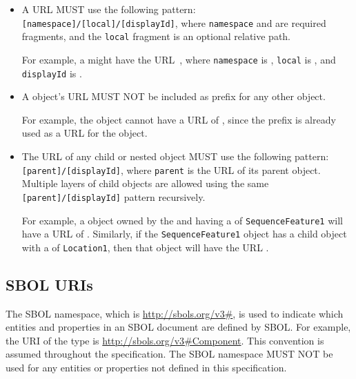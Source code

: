 \begin{itemize}

 \item A  URL MUST use the following pattern:
  \texttt{[namespace]/[local]/[displayId]},  where \texttt{namespace} and  are required fragments, and the \texttt{local} fragment is an optional relative path.
  
  	For example, a  might have the URL~, where \texttt{namespace} is , \texttt{local} is , and \texttt{displayId} is .

  \item A  object's URL MUST NOT be included as prefix for any other  object.
  
  	For example, the   object cannot have a URL of , since the  prefix is already used as a URL for the   object.

  \item The URL of any child or nested object MUST use the following pattern:\texttt{[parent]/[displayId]}, where \texttt{parent} is the URL of its parent object.
	Multiple layers of child objects are allowed using the same\\ \texttt{[parent]/[displayId]} pattern recursively.
	
	For example, a  object owned by the   and having a  of \texttt{SequenceFeature1} will have a URL of .
	Similarly, if the \texttt{SequenceFeature1} object has a  child object with a  of \texttt{Location1}, then that object will have the URL .
  \end{itemize}

\subsection{SBOL URIs}
  \label{sec:sbolURIs}
  
The SBOL namespace, which is \url{http://sbols.org/v3\#}, is used to indicate which entities and properties in an SBOL document are defined by SBOL. 
For example, the URI of the type  is \url{http://sbols.org/v3\#Component}. 
This convention is assumed throughout the specification.
The SBOL namespace MUST NOT be used for any entities or properties not defined in this specification.  


